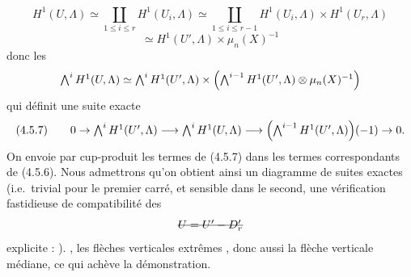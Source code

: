 \documentclass[11pt,a4paper]{article}
\begin{document}
\[
H^1(U, \Lambda) \simeq \coprod_{1 \leq i \leq r} H^1(U_i, \Lambda) \simeq \coprod_{1 \leq i \leq r-1} H^1(U_i, \Lambda) \times H^1(U_r, \Lambda)
\]
\[
\simeq H^1(U', \Lambda) \times \mu_n(X)^{-1}
\]
donc les  
\[
\textstyle\bigwedge^i H^1(U, \Lambda) \simeq \bigwedge^i H^1(U', \Lambda) \times \Bigl(\bigwedge^{i-1} H^1(U', \Lambda) \otimes \mu_n(X)^{-1}\Bigr)
\]
 qui définit une suite exacte
\[
(4.5.7) \qquad 0 \to \textstyle\bigwedge^i H^1(U', \Lambda) \longrightarrow \bigwedge^i H^1(U, \Lambda) \longrightarrow \Bigl(\bigwedge^{i-1} H^1(U', \Lambda)\Bigr)(-1) \to 0 .
\]
On \struck{\ill{}} envoie par cup-produit les termes de (4.5.7) dans les termes \struck{\ill{}} correspondants de (4.5.6). Nous admettrons qu'on obtient ainsi un diagramme de suites exactes (i.e.\ trivial pour le premier carré, et sensible dans le second, une vérification fastidieuse de \struck{\ill{}} compatibilité des  \struck{\ill{}}
\[
\text{\struck{$U = U' - D'_r$}}
\]
 \struck{\ill{}} explicite : ). \struck{\ill{}} ,  les flèches verticales extrêmes , \struck{\ill{}} donc aussi la flèche verticale médiane, ce qui achève la démonstration.

\end{document}
